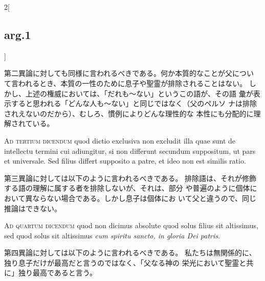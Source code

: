 \documentclass[paper=a4paper,fontsize=10pt,jafontsize=9pt,titlepage]{jlreq}
\begin{document}
\begin{paracol}{2}[\subsection{arg.1}]
\switchcolumn

第二異論に対しても同様に言われるべきである。何か本質的なことが父につい
 て言われるとき、本質の一性のために息子や聖霊が排除されることはない。
 しかし、上述の権威においては、「だれも〜ない」というこの語が、その語
 彙が表示すると思われる「どんな人も〜ない」と同じではなく（父のペルソ
 ナは排除されえないのだから）、むしろ、慣例によりどんな理性的な
 本性にも分配的に理解されている。

\switchcolumn*[\subsection{ad.3}]

{\scshape Ad tertium dicendum} quod dictio exclusiva non excludit illa quae sunt
de intellectu termini cui adiungitur, si non differunt secundum
suppositum, ut pars et universale. Sed filius differt supposito a
patre, et ideo non est similis ratio.

\switchcolumn

第三異論に対しては以下のように言われるべきである。
排除語は、それが修飾する語の理解に属する者を排除しないが、それは、部分
 や普遍のように個体において異ならない場合である。しかし息子は個体にお
 いて父と違うので、同じ推論はできない。

\switchcolumn*[\subsection{ad.4}]

{\scshape Ad quartum dicendum} quod non dicimus absolute quod solus filius sit
altissimus, sed quod solus sit altissimus {\itshape cum spiritu sancto, in
gloria Dei patris}.

\switchcolumn

第四異論に対しては以下のように言われるべきである。
私たちは無関係的に、独り息子だけが最高だと言うのではなく、「父なる神の
 栄光において聖霊と共に」独り最高であると言う。

\end{paracol}
\newpage
\end{document}
